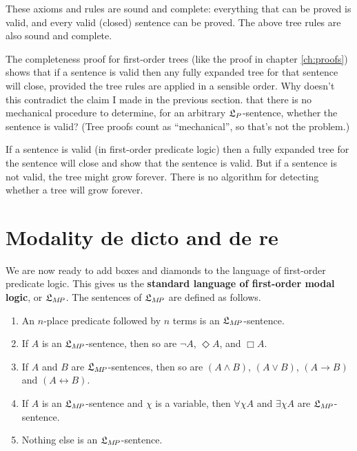 These axioms and rules are sound and complete: everything that can be proved is valid, and
every valid (closed) sentence can be proved. The above tree rules are also sound
and complete.

\begin{exercise}
  The completeness proof for first-order trees (like the proof in chapter
  \ref{ch:proofs}) shows that if a sentence is valid then any fully expanded
  tree for that sentence will close, provided the tree rules are applied in a
  sensible order. Why doesn't this contradict the claim I made in the previous
  section. that there is no mechanical procedure to determine, for an arbitrary
  $\mathfrak{L}_P$-sentence, whether the sentence is valid? (Tree proofs count as
  ``mechanical'', so that's not the problem.)
\end{exercise}
\begin{solution}
  If a sentence is valid (in first-order predicate logic) then a fully expanded
  tree for the sentence will close and show that the sentence is valid. But if a
  sentence is not valid, the tree might grow forever. There is no algorithm for
  detecting whether a tree will grow forever. 
\end{solution}


\section{Modality de dicto and de re}


We are now ready to add boxes and diamonds to the language of first-order
predicate logic. This gives us the \textbf{standard language of first-order
  modal logic}, or $\mathfrak{L}_{M\!P}$. The sentences of $\mathfrak{L}_{M\!P}$ are defined as
follows.
%
\begin{enumerate}[leftmargin=9mm]
  \itemsep-1mm
  \item An $n$-place predicate followed by $n$ terms is an $\mathfrak{L}_{M\!P}$-sentence.
  \item If $A$ is an $\mathfrak{L}_{M\!P}$-sentence, then so are $\neg A$, $\Diamond A$,
        and $\Box A$.
  \item If $A$ and $B$ are $\mathfrak{L}_{M\!P}$-sentences, then so are $(A \land B)$,
        $(A \lor B)$, $(A \to B)$ and $(A \leftrightarrow B)$.
  \item If $A$ is an $\mathfrak{L}_{M\!P}$-sentence and $\chi$ is a variable, then
        $\forall \chi A$ and $\exists \chi A$ are $\mathfrak{L}_{M\!P}$-sentence.
  \item Nothing else is an $\mathfrak{L}_{M\!P}$-sentence.
\end{enumerate}

